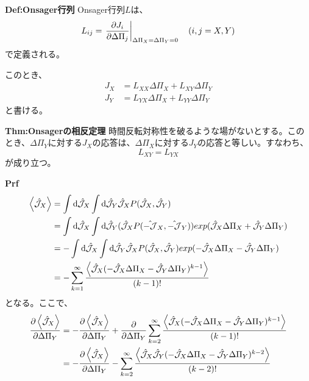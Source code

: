 \documentclass[a4paper,11pt]{jsarticle}
\begin{document}
\begin{itembox}[l]{\textbf{Def:Onsager行列}}
    Onsager行列$L$は、
    \begin{equation}
        L_{ij} = \left.\pdv{J_i}{\Delta \Pi_j}\right|_{\Delta \Pi_X=\Delta \Pi_Y=0} \quad (i,j = X,Y)
    \end{equation}
    で定義される。
\end{itembox}
このとき、
\begin{align}
    J_X &= L_{XX}\Delta\Pi_X + L_{XY}\Delta\Pi_Y\\
    J_Y &= L_{YX}\Delta\Pi_X + L_{YY}\Delta\Pi_Y
\end{align}
と書ける。\\
\begin{itembox}[l]{\textbf{Thm:Onsagerの相反定理}}
    時間反転対称性を破るような場がないとする。このとき、$\Delta \Pi_Y$に対する$J_X$の応答は、$\Delta \Pi_X$に対する$J_Y$の応答と等しい。すなわち、
    \begin{equation}
        L_{XY} = L_{YX}
    \end{equation}
    が成り立つ。
\end{itembox}
\textbf{Prf}\\
\begin{align}
    \ev{\hat{\mathcal{J}}_X} &= \int \dd \hat{\mathcal{J}}_X \int \dd \hat{\mathcal{J}}_Y \hat{\mathcal{J}}_X P(\hat{\mathcal{J}}_X, \hat{\mathcal{J}}_Y)\\
    &= \int \dd \hat{\mathcal{J}}_X \int \dd \hat{\mathcal{J}}_Y (\hat{\mathcal{J}}_X P(\hat{-\mathcal{J}}_X, \hat{-\mathcal{J}}_Y))exp(\hat{\mathcal{J}}_X \Delta \Pi_X + \hat{\mathcal{J}}_Y \Delta \Pi_Y)\\
    &= -\int \dd \hat{\mathcal{J}}_X \int \dd \hat{\mathcal{J}}_Y \hat{\mathcal{J}}_X P(\hat{\mathcal{J}}_X, \hat{\mathcal{J}}_Y)exp(-\hat{\mathcal{J}}_X \Delta \Pi_X - \hat{\mathcal{J}}_Y \Delta \Pi_Y)\\
    &= -\sum_{k=1}^{\infty} \frac{\ev{\hat{\mathcal{J}}_X(-\hat{\mathcal{J}}_X\Delta \Pi_X-\hat{\mathcal{J}}_Y\Delta \Pi_Y)^{k-1}}}{(k-1)!}
\end{align}
となる。ここで、
\begin{align}
    \pdv{\ev{\hat{\mathcal{J}}_X}}{\Delta \Pi_Y} &= -\pdv{\ev{\hat{\mathcal{J}}_X}}{\Delta \Pi_Y} + \pdv{\Delta \Pi_Y}\sum_{k=2}^{\infty} \frac{\ev{\hat{\mathcal{J}}_X(-\hat{\mathcal{J}}_X\Delta \Pi_X-\hat{\mathcal{J}}_Y\Delta \Pi_Y)^{k-1}}}{(k-1)!}\\
    &= -\pdv{\ev{\hat{\mathcal{J}}_X}}{\Delta \Pi_Y} - \sum_{k=2}^{\infty} \frac{\ev{\hat{\mathcal{J}}_X \hat{\mathcal{J}}_Y(-\hat{\mathcal{J}}_X\Delta \Pi_X-\hat{\mathcal{J}}_Y\Delta \Pi_Y)^{k-2}}}{(k-2)!}
\end{align}
\end{document}

